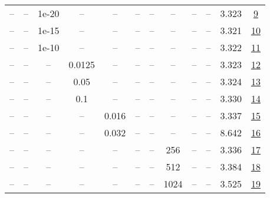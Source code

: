 \begin{table}[H]
\begin{tabular}{cccccccccccc}
-- & -- & 1e-20 & -- & -- & -- & -- & -- & -- & -- & 3.323 & \href{https://wandb.ai/stanford-mercury/optimizer-scaling/runs/sweep-130m-10B-marsb20ec1lr0.008-wd0.1-minlr0-warmup2000-b10.9-b-429792}{9} \\
-- & -- & 1e-15 & -- & -- & -- & -- & -- & -- & -- & 3.321 & \href{https://wandb.ai/stanford-mercury/optimizer-scaling/runs/sweep-130m-10B-mars320502lr0.008-wd0.1-minlr0-warmup2000-b10.9-b-52c30e}{10} \\
-- & -- & 1e-10 & -- & -- & -- & -- & -- & -- & -- & 3.322 & \href{https://wandb.ai/stanford-mercury/optimizer-scaling/runs/sweep-130m-10B-mars330c3flr0.008-wd0.1-minlr0-warmup2000-b10.9-b-1789fc}{11} \\
-- & -- & -- & 0.0125 & -- & -- & -- & -- & -- & -- & 3.323 & \href{https://wandb.ai/stanford-mercury/optimizer-scaling/runs/sweep-130m-10B-marsdd8631lr0.008-wd0.1-minlr0-warmup2000-b10.9-b-569c37}{12} \\
-- & -- & -- & 0.05 & -- & -- & -- & -- & -- & -- & 3.324 & \href{https://wandb.ai/stanford-mercury/optimizer-scaling/runs/sweep-130m-10B-marsec6a72lr0.008-wd0.1-minlr0-warmup2000-b10.9-b-170a20}{13} \\
-- & -- & -- & 0.1 & -- & -- & -- & -- & -- & -- & 3.330 & \href{https://wandb.ai/stanford-mercury/optimizer-scaling/runs/sweep-130m-10B-mars9f1631lr0.008-wd0.1-minlr0-warmup2000-b10.9-b-a3be4e}{14} \\
-- & -- & -- & -- & 0.016 & -- & -- & -- & -- & -- & 3.337 & \href{https://wandb.ai/stanford-mercury/optimizer-scaling/runs/sweep-130m-10B-marsa22b0blr0.016-wd0.1-minlr0-warmup2000-b10.9-b-5f5677}{15} \\
-- & -- & -- & -- & 0.032 & -- & -- & -- & -- & -- & 8.642 & \href{https://wandb.ai/stanford-mercury/optimizer-scaling/runs/sweep-130m-10B-marse7bb5elr0.032-wd0.1-minlr0-warmup2000-b10.9-b-5dc390}{16} \\
-- & -- & -- & -- & -- & -- & -- & 256 & -- & -- & 3.336 & \href{https://wandb.ai/stanford-mercury/optimizer-scaling/runs/sweep-130m-10B-mars3389a5lr0.008-wd0.1-minlr0-warmup2000-b10.9-b-27c86b}{17} \\
-- & -- & -- & -- & -- & -- & -- & 512 & -- & -- & 3.384 & \href{https://wandb.ai/stanford-mercury/optimizer-scaling/runs/sweep-130m-10B-marsafd3efclr0.008-wd0.1-minlr0-warmup2000-b10.9--f46415}{18} \\
-- & -- & -- & -- & -- & -- & -- & 1024 & -- & -- & 3.525 & \href{https://wandb.ai/stanford-mercury/optimizer-scaling/runs/sweep-130m-10B-mars1129d3lr0.008-wd0.1-minlr0-warmup2000-b10.9-b-b11208}{19} \\

\end{tabular}
\end{table}
